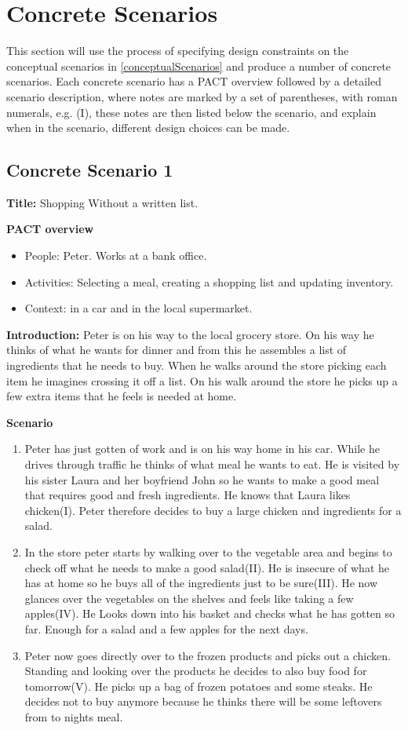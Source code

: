\section{Concrete Scenarios}
This section will use the process of specifying design constraints on the conceptual scenarios in \cref{conceptualScenarios} and produce a number of concrete scenarios. Each concrete scenario has a PACT overview followed by a detailed scenario description, where notes are marked by a set of parentheses, with roman numerals, e.g. (I), these notes are then listed below the scenario, and explain when in the scenario, different design choices can be made.

\subsection{Concrete Scenario 1}\label{ConcreteScenario1}

\textbf{Title:} Shopping Without a written list.

\textbf{PACT overview}
\begin{itemize}
\item People: Peter. Works at a bank office.
\item Activities: Selecting a meal, creating a shopping list and updating inventory.  
\item Context: in a car and in the local supermarket.
\end{itemize}

\textbf{Introduction:} Peter is on his way to the local grocery store. On his way he thinks of what he wants for dinner and from this he assembles a list of ingredients that he needs to buy. When he walks around the store picking each item he imagines crossing it off a list. On his walk around the store he picks up a few extra items that he feels is needed at home.

\textbf{Scenario}
\begin{enumerate}
\item Peter has just gotten of work and is on his way home in his car. While he drives through traffic he thinks of what meal he wants to eat. He is visited by his sister Laura and her boyfriend John so he wants to make a good meal that requires good and fresh ingredients. He knows that Laura likes chicken(I). Peter therefore decides to buy a large chicken and ingredients for a salad. 
\item In the store peter starts by walking over to the vegetable area and begins to check off what he needs to make a good salad(II). He is insecure of what he has at home so he buys all of the ingredients just to be sure(III). He now glances over the vegetables on the shelves and feels like taking a few apples(IV). He Looks down into his basket and checks what he has gotten so far. Enough for a salad and a few apples for the next days.
\item Peter now goes directly over to the frozen products and picks out a chicken. Standing and looking over the products he decides to also buy food for tomorrow(V). He picks up a bag of frozen potatoes and some steaks. He decides not to buy anymore because he thinks there will be some leftovers from to nights meal.  
\end{enumerate}


